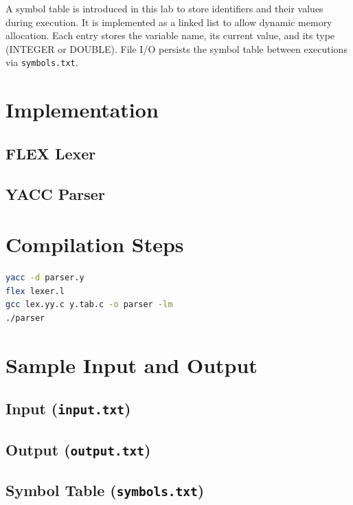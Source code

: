 \documentclass{article}
\begin{document}
A symbol table is introduced in this lab to store identifiers and their values during execution. It is implemented as a linked list to allow dynamic memory allocation. Each entry stores the variable name, its current value, and its type (INTEGER or DOUBLE). File I/O persists the symbol table between executions via \texttt{symbols.txt}.

\section{Implementation}

\subsection{FLEX Lexer}



\subsection{YACC Parser}



\section{Compilation Steps}

\begin{lstlisting}[language=bash, caption=Build and Run]
yacc -d parser.y
flex lexer.l
gcc lex.yy.c y.tab.c -o parser -lm
./parser
\end{lstlisting}

\section{Sample Input and Output}

\subsection{Input (\texttt{input.txt})}


\subsection{Output (\texttt{output.txt})}


\subsection{Symbol Table (\texttt{symbols.txt})}

\end{document}
